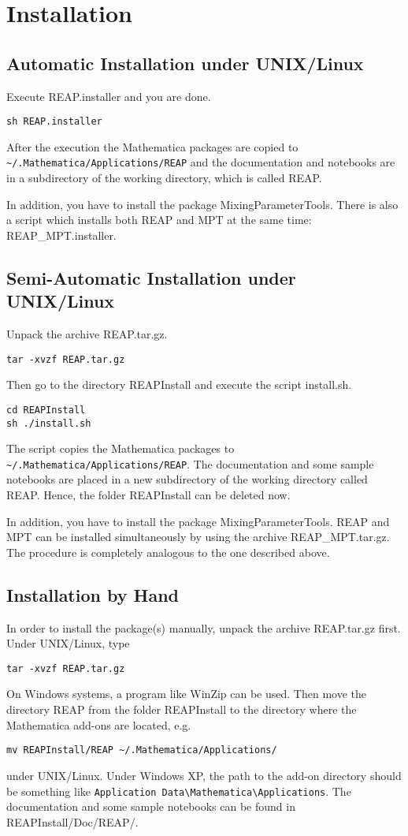 \section{Installation}

\subsection{Automatic Installation under UNIX/Linux}

Execute REAP.installer and you are done.
\begin{verbatim}
sh REAP.installer
\end{verbatim}
After the execution the Mathematica packages are copied to
\verb+~/.Mathematica/Applications/REAP+ and the documentation and notebooks are in a
subdirectory of the working directory, which is called REAP.

In addition, you have to install the package MixingParameterTools. There is also
a script which installs both REAP and MPT at the same time:
REAP\_MPT.installer.


\subsection{Semi-Automatic Installation under UNIX/Linux}

Unpack the archive REAP.tar.gz.
\begin{verbatim}
tar -xvzf REAP.tar.gz
\end{verbatim}
Then go to the directory REAPInstall and execute the script install.sh.
\begin{verbatim}
cd REAPInstall
sh ./install.sh
\end{verbatim}
The script copies the Mathematica packages to
\verb+~/.Mathematica/Applications/REAP+.  
The documentation and some sample notebooks are placed in a new
subdirectory of the working directory called REAP.  Hence, the folder
REAPInstall can be deleted now.

In addition, you have to install the package MixingParameterTools.
REAP and MPT can be installed simultaneously by using the archive
REAP\_MPT.tar.gz.  The procedure is completely analogous to the one
described above.


\subsection{Installation by Hand}

In order to install the package(s) manually, unpack the archive
REAP.tar.gz first.  Under UNIX/Linux, type
\begin{verbatim}
tar -xvzf REAP.tar.gz
\end{verbatim}
On Windows systems, a program like WinZip can be used.
Then move the directory REAP from the folder
REAPInstall to the directory
where the Mathematica add-ons are located, e.g.\
\begin{verbatim}
mv REAPInstall/REAP ~/.Mathematica/Applications/
\end{verbatim}
under UNIX/Linux. 
Under Windows XP, the path to the add-on directory should be something
like \verb+Application Data\Mathematica\Applications+.
The documentation and some sample notebooks can be found in
REAPInstall/Doc/REAP/.

